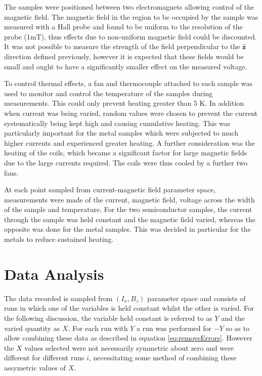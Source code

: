 \documentclass[a4paper]{article}
\begin{document}
		The samples were positioned between two electromagnets allowing control of the magnetic field. The magnetic field in the region to be occupied by the sample was measured with a Hall probe and found to be uniform to the resolution of the probe (1mT), thus effects due to non-uniform magnetic field could be discounted. It was not possible to measure the strength of the field perpendicular to the $\hat{\mathbf{z}}$ direction defined previously, however it is expected that these fields would be small and ought to have a significantly smaller effect on the measured voltage.
		
		To control thermal effects, a fan and thermocouple attached to each sample was used to monitor and control the temperature of the samples during measurements. This could only prevent heating greater than 5 K. In addition when current was being varied, random values were chosen to prevent the current systematically being kept high and causing cumulative heating. This was particularly important for the metal samples which were subjected to much higher currents and experienced greater heating. A further consideration was the heating of the coils, which became a significant factor for large magnetic fields due to the large currents required. The coils were thus cooled by a further two fans.
		
		At each point sampled from current-magnetic field parameter space, measurements were made of the current, magnetic field, voltage across the width of the sample and temperature. For the two semiconductor samples, the current through the sample was held constant and the magnetic field varied, whereas the opposite was done for the metal samples. This was decided in particular for the metals to reduce sustained heating.
	
	\section{Data Analysis}
		The data recorded is sampled from $(I_x,B_z)$ parameter space and consists of runs in which one of the variables is held constant whilst the other is varied. For the following discussion, the variable held constant is referred to as $Y$ and the varied quantity as $X$. For each run with $Y$ a run was performed for $-Y$ so as to allow combining these data as described in equation \ref{eq:removeErrors}. However the $X$ values selected were not necessarily symmetric about zero and were different for different runs $i$, necessitating some method of combining these assymetric values of $X$.
		
\end{document}
